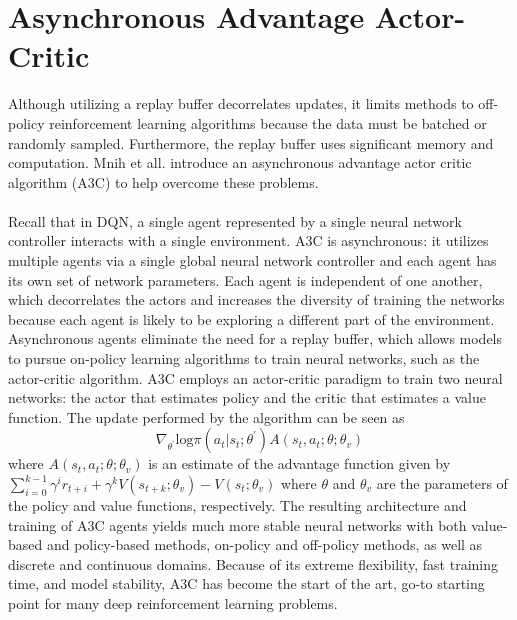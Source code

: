 \documentclass[journal,onecolumn]{IEEEtran}
\begin{document}
\section{Asynchronous Advantage Actor-Critic}
Although utilizing a replay buffer decorrelates updates, it limits methods to off-policy reinforcement learning algorithms because the data must be batched or randomly sampled. Furthermore, the replay buffer uses significant memory and computation. Mnih et all. introduce an asynchronous advantage actor critic algorithm (A3C) to help overcome these problems. \\\\
Recall that in DQN, a single agent represented by a single neural network controller interacts with a single environment. A3C is asynchronous: it utilizes multiple agents via a single global neural network controller and each agent has its own set of network parameters. Each agent is independent of one another, which decorrelates the actors and increases the diversity of training the networks because each agent is likely to be exploring a different part of the environment. Asynchronous agents eliminate the need for a replay buffer, which allows models to pursue on-policy learning algorithms to train neural networks, such as the actor-critic algorithm. A3C employs an actor-critic paradigm to train two neural networks: the actor that estimates policy and the critic that estimates a value function. The update performed by the algorithm can be seen as
\[
\nabla_{\theta^{'}}\text{log}\pi(a_{t}|s_{t};\theta^{'})A(s_{t},a_{t};\theta;\theta_{v})
\]
where $A(s_{t},a_{t};\theta;\theta_{v})$ is an estimate of the advantage function given by $\sum_{i=0}^{k-1}\gamma^{i}r_{t+i}+\gamma^{k}V(s_{t+k};\theta_{v}) - V(s_{t};\theta_{v})$ where $\theta$ and $\theta_{v}$ are the parameters of the policy and value functions, respectively. The resulting architecture and training of A3C agents yields much more stable neural networks with both value-based and policy-based methods, on-policy and off-policy methods, as well as discrete and continuous domains. Because of its extreme flexibility, fast training time, and model stability, A3C has become the start of the art, go-to starting point for many deep reinforcement learning problems. 



\cite{DBLP:journals/corr/LillicrapHPHETS15}
\cite{DBLP:journals/corr/MnihKSGAWR13}
\cite{DBLP:journals/corr/WangFL15}
\end{document}
